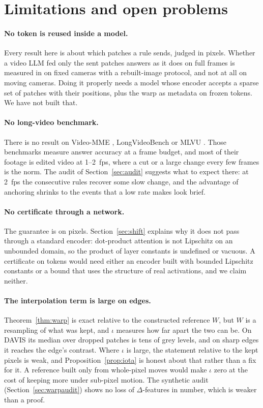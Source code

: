 \section{Limitations and open problems}
\label{sec:limits}

\paragraph{No token is reused inside a model.} Every result here is about which patches a rule sends, judged in pixels. Whether a video LLM fed only the sent patches answers as it does on full frames is measured in \citet{nair2026certifiedskip} on fixed cameras with a rebuilt-image protocol, and not at all on moving cameras. Doing it properly needs a model whose encoder accepts a sparse set of patches with their positions, plus the warp as metadata on frozen tokens. We have not built that.

\paragraph{No long-video benchmark.} There is no result on Video-MME \citep{fu2024videomme}, LongVideoBench \citep{wu2024longvideobench} or MLVU \citep{zhou2024mlvu}. Those benchmarks measure answer accuracy at a frame budget, and most of their footage is edited video at 1--2~fps, where a cut or a large change every few frames is the norm. The audit of Section~\ref{sec:audit} suggests what to expect there: at 2~fps the consecutive rules recover some slow change, and the advantage of anchoring shrinks to the events that a low rate makes look brief.

\paragraph{No certificate through a network.} The guarantee is on pixels. Section~\ref{sec:shift} explains why it does not pass through a standard encoder: dot-product attention is not Lipschitz on an unbounded domain, so the product of layer constants is undefined or vacuous. A certificate on tokens would need either an encoder built with bounded Lipschitz constants or a bound that uses the structure of real activations, and we claim neither.

\paragraph{The interpolation term is large on edges.} Theorem~\ref{thm:warp} is exact relative to the constructed reference $W$, but $W$ is a resampling of what was kept, and $\iota$ measures how far apart the two can be. On DAVIS its median over dropped patches is tens of grey levels, and on sharp edges it reaches the edge's contrast. Where $\iota$ is large, the statement relative to the kept pixels is weak, and Proposition~\ref{prop:iota} is honest about that rather than a fix for it. A reference built only from whole-pixel moves would make $\iota$ zero at the cost of keeping more under sub-pixel motion. The synthetic audit (Section~\ref{sec:warpaudit}) shows no loss of $\Delta$-features in number, which is weaker than a proof.

